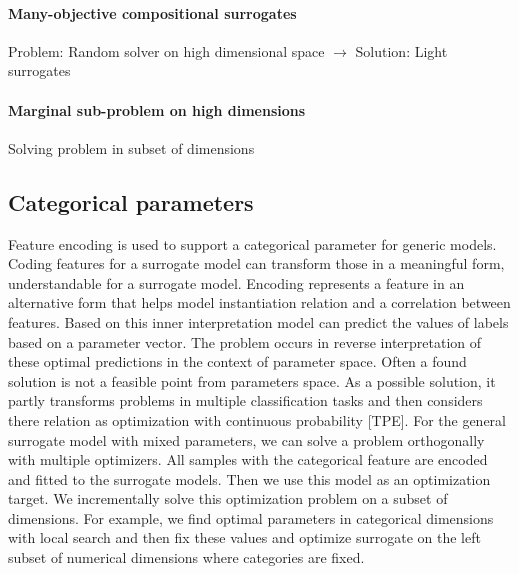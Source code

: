             \paragraph{Many-objective compositional surrogates}
            Problem: Random solver on high dimensional space $\rightarrow$ Solution: Light surrogates 


            \paragraph{Marginal sub-problem on high dimensions}
            Solving problem in subset of dimensions

        \subsection{Categorical parameters}

        Feature encoding is used to support a categorical parameter for generic models. Coding features for a surrogate model can transform those in a meaningful form, understandable for a surrogate model. Encoding represents a feature in an alternative form that helps model instantiation relation and a correlation between features. Based on this inner interpretation model can predict the values of labels based on a parameter vector. The problem occurs in reverse interpretation of these optimal predictions in the context of parameter space. Often a found solution is not a feasible point from parameters space. As a possible solution, it partly transforms problems in multiple classification tasks and then considers there relation as optimization with continuous probability [TPE]. For the general surrogate model with mixed parameters, we can solve a problem orthogonally with multiple optimizers. All samples with the categorical feature are encoded and fitted to the surrogate models. Then we use this model as an optimization target.  We incrementally solve this optimization problem on a subset of dimensions. For example, we find optimal parameters in categorical dimensions with local search and then fix these values and optimize surrogate on the left subset of numerical dimensions where categories are fixed. 




